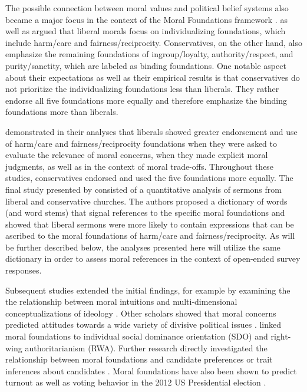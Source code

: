 \documentclass[12pt]{article}
\begin{document}
The possible connection between moral values and political belief systems also became a major focus in the context of the Moral Foundations framework \citep[c.f.][]{haidt2012righteous}. \citet{haidt2007morality} as well as \citet{graham2009liberals} argued that liberal morals focus on individualizing foundations, which include harm/care and fairness/reciprocity. Conservatives, on the other hand, also emphasize the remaining foundations of ingroup/loyalty, authority/respect, and purity/sanctity, which are labeled as binding foundations. One notable aspect about their expectations as well as their empirical results is that conservatives do not prioritize the individualizing foundations less than liberals. They rather endorse all five foundations more equally and therefore emphasize the binding foundations more than liberals.

\citet{graham2009liberals} demonstrated in their analyses that liberals showed greater endorsement and use of harm/care and fairness/reciprocity foundations when they were asked to evaluate the relevance of moral concerns, when they made explicit moral judgments, as well as in the context of moral trade-offs. Throughout these studies, conservatives endorsed and used the five foundations more equally. The final study presented by \citet{graham2009liberals} consisted of a quantitative analysis of sermons from liberal and conservative churches. The authors proposed a dictionary of words (and word stems) that signal references to the specific moral foundations and showed that liberal sermons were more likely to contain expressions that can be ascribed to the moral foundations of harm/care and fairness/reciprocity. As will be further described below, the analyses presented here will utilize the same dictionary in order to assess moral references in the context of open-ended survey responses.

Subsequent studies extended the initial findings, for example by examining the the relationship between moral intuitions and multi-dimensional conceptualizations of ideology \citep[c.f.][]{haidt2009above}.  Other scholars showed that moral concerns predicted attitudes towards a wide variety of divisive political issues \citep[e.g.][]{koleva2012tracing,low2015moral}. \citet{federico2013mapping} linked moral foundations to individual social dominance orientation (SDO) and right-wing authoritarianism (RWA). Further research directly investigated the relationship between moral foundations and candidate preferences \citep{iyer2010beyond} or trait inferences about candidates \citep{clifford2014linking}. Moral foundations have also been shown to predict turnout \citep{johnson2014ideology} as well as voting behavior in the 2012 US Presidential election \citep{franks2015using}.
\end{document}

